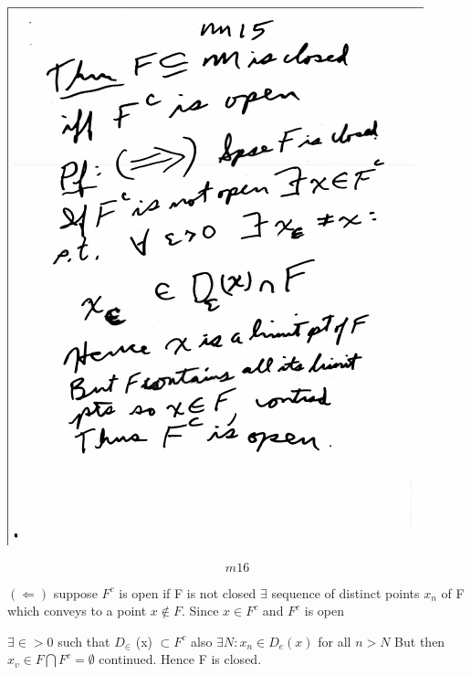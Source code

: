 \documentclass[10pt,a4paper]{article}
\begin{document}
{{\includegraphics[scale=.75]{Pages/MS2_15}
\newpage

$$m16$$

$(\Leftarrow)$ suppose $F^c$ is open if F is not closed $\exists$ sequence of distinct points $x_n$ of F which conveys to a point $x \notin F$.
Since $x \in F^c$ and $F^c$ is open

$\exists \in > 0$ such that $D_\in$ (x) $\subset F^c$ also $\exists N : x_n \in D_e(x)$ for all $n>N$ But then $x_v \in F \bigcap F^c = \emptyset$ continued. Hence F is closed.

}}
\end{document}
